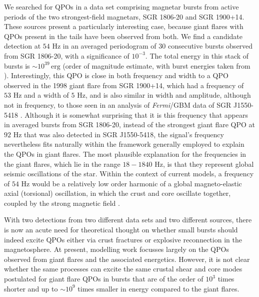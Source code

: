 \documentclass[numberedappendix]{emulateapj}
\newcommand{\hz}{\,\mathrm{Hz}}
\newcommand{\project}[1]{\textsl{#1}}
\newcommand{\fermi}{\project{Fermi}}
\begin{document}
We searched for QPOs in a data set comprising magnetar bursts from active periods of the two strongest-field magnetars, SGR 1806-20 and SGR 1900+14. These sources present a particularly interesting case, because giant flares with QPOs present in the tails have been observed from both.
We find a candidate detection at $54 \,\hz$ in an averaged periodogram of 30 consecutive bursts observed from SGR 1806-20, with a significance of $10^{-3}$. The total energy in this stack of bursts is $\sim 10^{39} \, \mathrm{erg}$ (order of magnitude estimate, with burst energies taken from \citealt{gogus2000}). Interestingly, this QPO is close in both frequency and width to a QPO observed in the 1998 giant flare from SGR 1900+14, which had a frequency of $53\,\hz$ and a width of $5\,\hz$, and is also similar in width and amplitude, although not in frequency, to those seen in an analysis of \fermi/GBM data of SGR J1550-5418 \citep{huppenkothen2014}. Although it is somewhat surprising that it is this frequency that appears in averaged bursts from SGR 1806-20, instead of the strongest giant flare QPO at $92\,\hz$ that was also detected in SGR J1550-5418, the signal's frequency nevertheless fits naturally within the framework generally employed to explain the QPOs in giant flares. The most plausible explanation for the frequencies in the giant flares, which lie in the range $18 - 1840 \, \hz$, is that they represent global seismic oscillations of the star.   Within the context of current models, a frequency of $54 \,\hz$ would be a relatively low order harmonic of a global magneto-elastic axial (torsional) oscillation, in which the crust and core oscillate together, coupled by the strong magnetic field \citep{glampedakis2006,andersson2009,steiner2009,vanhoven2011,vanhoven2012,colaiuda2011,colaiuda2012,gabler2012,gabler2013,passamonti2013b,passamonti2014,glampedakis2014}.


With two detections from two different data sets and two different sources, there is now an acute need for theoretical thought on whether small bursts should indeed excite QPOs either via crust fractures or explosive reconnection in the magnetosphere. At present, modelling work focusses largely on the QPOs observed from giant flares and the associated energetics. However, it is not clear whether the same processes can excite the same crustal shear and core modes postulated for giant flare QPOs in bursts that are of the order of $10^3$ times shorter and up to $\sim 10^{9}$ times smaller in energy compared to the giant flares.
\end{document}
